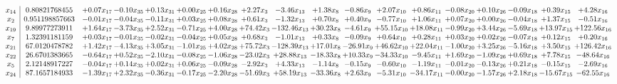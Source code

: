 \documentclass[9pt]{article}
\begin{document}
 \[\begin{array}{c| c c@{\hskip 2pt} c@{\hskip 2pt} c@{\hskip 2pt} c@{\hskip 2pt} c@{\hskip 2pt} c@{\hskip 2pt} c@{\hskip 2pt} c@{\hskip 2pt} c@{\hskip 2pt} c@{\hskip 2pt} c@{\hskip 2pt} c@{\hskip 2pt} c@{\hskip 2pt} c@{\hskip 2pt} c@{\hskip 2pt} c@{\hskip 2pt} }
 x_{14}   &  0.80821768455 & +  0.07 x_{17} & -0.10 x_{35} & +  0.13 x_{31} & +  0.00 x_{25} & +  0.16 x_{28} & +  2.27 x_{3} & -3.46 x_{13} & +  1.38 x_{8} & -0.86 x_{9} & +  2.07 x_{10} & +  0.86 x_{11} & -0.08 x_{20} & +  0.10 x_{26} & -0.09 x_{18} & +  0.39 x_{15} & +  4.28 x_{16}\\
 x_{2}   &  0.951198857663 & -0.01 x_{17} & -0.04 x_{35} & -0.11 x_{31} & +  0.03 x_{25} & +  0.08 x_{28} & +  0.61 x_{3} & -1.32 x_{13} & +  0.70 x_{8} & +  0.40 x_{9} & -0.77 x_{10} & +  1.06 x_{11} & +  0.07 x_{20} & +  0.00 x_{26} & -0.04 x_{18} & +  1.37 x_{15} & -0.51 x_{16}\\
 x_{19}   &  9.89977273911 & +  1.64 x_{17} & -3.73 x_{35} & +  2.52 x_{31} & -0.71 x_{25} & +  4.00 x_{28} & + 74.42 x_{3} & -132.46 x_{13} & + 30.23 x_{8} & -4.61 x_{9} & + 55.15 x_{10} & + 18.08 x_{11} & -0.99 x_{20} & +  3.44 x_{26} & -5.69 x_{18} & + 13.97 x_{15} & + 122.56 x_{16}\\
 x_{7}   &  1.32391181159 & +  0.03 x_{17} & -0.01 x_{35} & -0.02 x_{31} & -0.04 x_{25} & +  0.05 x_{28} & +  0.68 x_{3} & -1.01 x_{13} & +  0.33 x_{8} & -0.09 x_{9} & +  0.64 x_{10} & +  0.28 x_{11} & +  0.03 x_{20} & +  0.02 x_{26} & -0.07 x_{18} & +  0.12 x_{15} & +  0.20 x_{16}\\
 x_{21}   &  67.0120478782 & +  1.42 x_{17} & -4.13 x_{35} & +  3.05 x_{31} & -1.01 x_{25} & +  4.02 x_{28} & + 75.72 x_{3} & -128.39 x_{13} & + 17.01 x_{8} & -26.91 x_{9} & + 46.62 x_{10} & + 22.04 x_{11} & -1.00 x_{20} & +  3.25 x_{26} & -5.16 x_{18} & +  3.50 x_{15} & + 126.42 x_{16}\\
 x_{22}   &  26.6701383665 & -0.64 x_{17} & +  0.52 x_{35} & -2.10 x_{31} & -0.08 x_{25} & -1.06 x_{28} & -23.02 x_{3} & + 28.88 x_{13} & -18.33 x_{8} & + 10.33 x_{9} & -34.33 x_{10} & -9.45 x_{11} & +  1.69 x_{20} & -1.09 x_{26} & +  0.69 x_{18} & +  7.78 x_{15} & -48.64 x_{16}\\
 x_{5}   &  2.12148917227 & -0.04 x_{17} & +  0.14 x_{35} & +  0.02 x_{31} & +  0.06 x_{25} & -0.09 x_{28} & -2.92 x_{3} & +  4.33 x_{13} & -1.14 x_{8} & -0.15 x_{9} & -0.60 x_{10} & -1.19 x_{11} & -0.01 x_{20} & -0.13 x_{26} & +  0.21 x_{18} & -0.15 x_{15} & -2.69 x_{16}\\
 x_{24}   &  87.1657184933 & -1.39 x_{17} & +  2.32 x_{35} & -0.36 x_{31} & -0.17 x_{25} & -2.20 x_{28} & -51.69 x_{3} & + 58.19 x_{13} & -33.36 x_{8} & +  2.63 x_{9} & -5.31 x_{10} & -34.17 x_{11} & -0.00 x_{20} & -1.57 x_{26} & +  2.18 x_{18} & -15.67 x_{15} & -62.55 x_{16}\\

\end{array}\]
\end{document}
